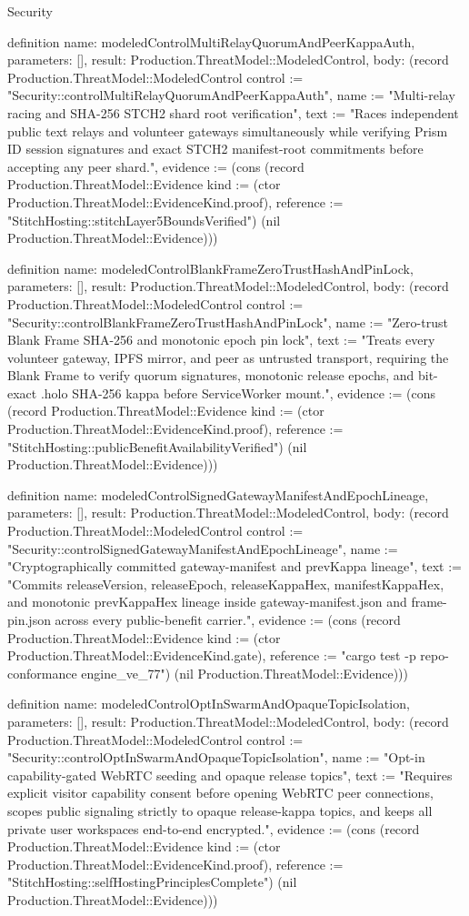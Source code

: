 \begin{lexlean}{Security}
\begin{semanticmodule}
definition{
  name: modeledControlMultiRelayQuorumAndPeerKappaAuth,
  parameters: [],
  result: Production.ThreatModel::ModeledControl,
  body: (record Production.ThreatModel::ModeledControl {control := "Security::controlMultiRelayQuorumAndPeerKappaAuth", name := "Multi-relay racing and SHA-256 STCH2 shard root verification", text := "Races independent public text relays and volunteer gateways simultaneously while verifying Prism ID session signatures and exact STCH2 manifest-root commitments before accepting any peer shard.", evidence := (cons (record Production.ThreatModel::Evidence {kind := (ctor Production.ThreatModel::EvidenceKind.proof), reference := "StitchHosting::stitchLayer5BoundsVerified"}) (nil Production.ThreatModel::Evidence))})
}

definition{
  name: modeledControlBlankFrameZeroTrustHashAndPinLock,
  parameters: [],
  result: Production.ThreatModel::ModeledControl,
  body: (record Production.ThreatModel::ModeledControl {control := "Security::controlBlankFrameZeroTrustHashAndPinLock", name := "Zero-trust Blank Frame SHA-256 and monotonic epoch pin lock", text := "Treats every volunteer gateway, IPFS mirror, and peer as untrusted transport, requiring the Blank Frame to verify quorum signatures, monotonic release epochs, and bit-exact .holo SHA-256 kappa before ServiceWorker mount.", evidence := (cons (record Production.ThreatModel::Evidence {kind := (ctor Production.ThreatModel::EvidenceKind.proof), reference := "StitchHosting::publicBenefitAvailabilityVerified"}) (nil Production.ThreatModel::Evidence))})
}

definition{
  name: modeledControlSignedGatewayManifestAndEpochLineage,
  parameters: [],
  result: Production.ThreatModel::ModeledControl,
  body: (record Production.ThreatModel::ModeledControl {control := "Security::controlSignedGatewayManifestAndEpochLineage", name := "Cryptographically committed gateway-manifest and prevKappa lineage", text := "Commits releaseVersion, releaseEpoch, releaseKappaHex, manifestKappaHex, and monotonic prevKappaHex lineage inside gateway-manifest.json and frame-pin.json across every public-benefit carrier.", evidence := (cons (record Production.ThreatModel::Evidence {kind := (ctor Production.ThreatModel::EvidenceKind.gate), reference := "cargo test -p repo-conformance engine_ve_77"}) (nil Production.ThreatModel::Evidence))})
}

definition{
  name: modeledControlOptInSwarmAndOpaqueTopicIsolation,
  parameters: [],
  result: Production.ThreatModel::ModeledControl,
  body: (record Production.ThreatModel::ModeledControl {control := "Security::controlOptInSwarmAndOpaqueTopicIsolation", name := "Opt-in capability-gated WebRTC seeding and opaque release topics", text := "Requires explicit visitor capability consent before opening WebRTC peer connections, scopes public signaling strictly to opaque release-kappa topics, and keeps all private user workspaces end-to-end encrypted.", evidence := (cons (record Production.ThreatModel::Evidence {kind := (ctor Production.ThreatModel::EvidenceKind.proof), reference := "StitchHosting::selfHostingPrinciplesComplete"}) (nil Production.ThreatModel::Evidence))})
}


\end{semanticmodule}
\end{lexlean}
